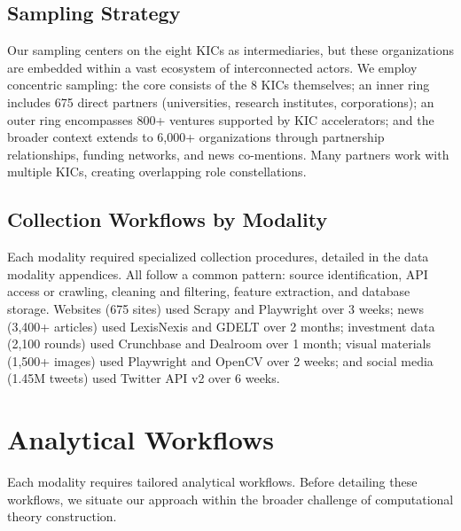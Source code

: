 \documentclass[../main.tex]{subfiles}
\begin{document}
\subsection{Sampling Strategy}

Our sampling centers on the eight KICs as intermediaries, but these organizations are embedded within a vast ecosystem of interconnected actors. We employ concentric sampling: the core consists of the 8 KICs themselves; an inner ring includes 675 direct partners (universities, research institutes, corporations); an outer ring encompasses 800+ ventures supported by KIC accelerators; and the broader context extends to 6,000+ organizations through partnership relationships, funding networks, and news co-mentions. Many partners work with multiple KICs, creating overlapping role constellations.


\subsection{Collection Workflows by Modality}

Each modality required specialized collection procedures, detailed in the data modality appendices. All follow a common pattern: source identification, API access or crawling, cleaning and filtering, feature extraction, and database storage. Websites (675 sites) used Scrapy and Playwright over 3 weeks; news (3,400+ articles) used LexisNexis and GDELT over 2 months; investment data (2,100 rounds) used Crunchbase and Dealroom over 1 month; visual materials (1,500+ images) used Playwright and OpenCV over 2 weeks; and social media (1.45M tweets) used Twitter API v2 over 6 weeks.


\section{Analytical Workflows}

Each modality requires tailored analytical workflows. Before detailing these workflows, we situate our approach within the broader challenge of computational theory construction.
\end{document}
